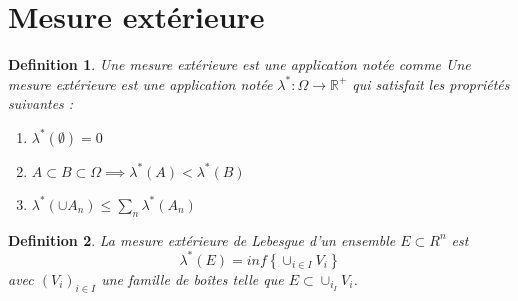 \documentclass[a4paper]{article}
\newcommand{\R}{\mathbb{R}}
\newtheorem{definition}{Definition}[section]
\begin{document}
\section{Mesure extérieure}%
% 
\label{sec:Outer measure}%

\begin{definition}
    Une mesure extérieure est une application notée comme 
    Une mesure extérieure est une application notée $\lambda^*: \Omega \to \R^+$ qui satisfait les propriétés suivantes :
    \begin{enumerate}
        
        \item $\lambda^*(\emptyset) = 0$
        \item $A \subset B \subset \Omega \implies \lambda^*(A) < \lambda^*(B)$ 
        \item $\lambda^*(\cup A_n) \le \sum_n \lambda^*(A_n)$
    \end{enumerate}
\end{definition}%

\begin{definition}\label{defn:lebesgue-outer-measure}
    La mesure extérieure de Lebesgue d'un ensemble $E \subset R^n$ est 
    \[
        \lambda^*(E) = inf \left\{ \cup_{i \in I} V_i \right\}
    \] 
    avec $(V_i)_{i \in I}$ une famille de boîtes telle que $E \subset \cup_{i_I} V_i$.
\end{definition}%
\end{document}
